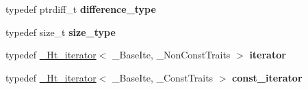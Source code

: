 \begin{DoxyCompactItemize}
\item 
\mbox{\label{struct___ht__iterator_a7f64db1e6d4aa21cd8441c06f3ea4592}} 
typedef ptrdiff\+\_\+t {\bfseries difference\+\_\+type}
\item 
\mbox{\label{struct___ht__iterator_ae3297b19e56a2f3c54ef99c6cd51bca9}} 
typedef size\+\_\+t {\bfseries size\+\_\+type}
\item 
\mbox{\label{struct___ht__iterator_a93fa6738d7bb0aa748b0b36f0c1e3675}} 
typedef \hyperlink{struct___ht__iterator}{\+\_\+\+Ht\+\_\+iterator}$<$ \+\_\+\+Base\+Ite, \+\_\+\+Non\+Const\+Traits $>$ {\bfseries iterator}
\item 
\mbox{\label{struct___ht__iterator_a09cd9bce12a20b99db815567a93d3c74}} 
typedef \hyperlink{struct___ht__iterator}{\+\_\+\+Ht\+\_\+iterator}$<$ \+\_\+\+Base\+Ite, \+\_\+\+Const\+Traits $>$ {\bfseries const\+\_\+iterator}
\end{DoxyCompactItemize}
